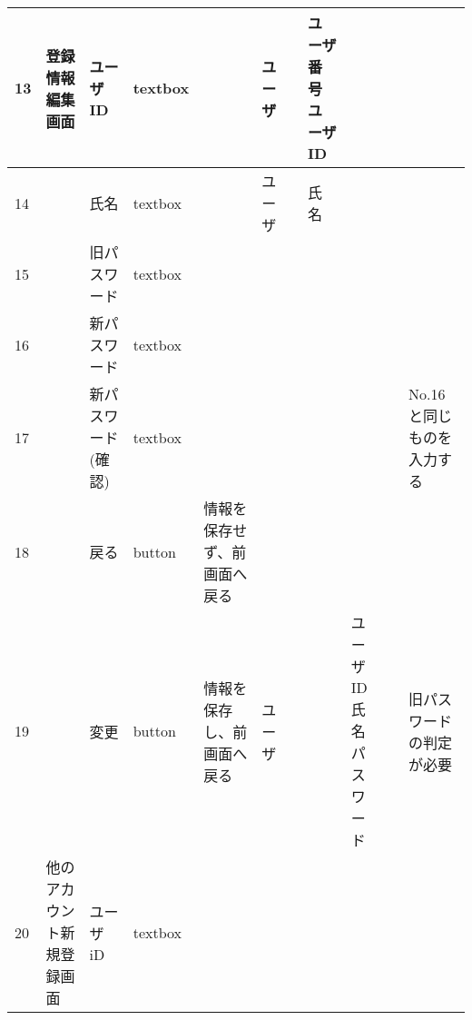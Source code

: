 \begin{table}[]
\begin{tabular}{|l|l|l|l|l|l|l|l|l|l|l|}
13  & 登録情報編集画面      & ユーザID            & textbox  &                                                                   & ユーザ     &                       & ユーザ番号ユーザID         &                 &                               &                                                                \\ \hline
14  &               & 氏名               & textbox  &                                                                   & ユーザ     &                       & 氏名                 &                 &                               &                                                                \\ \hline
15  &               & 旧パスワード           & textbox  &                                                                   &         &                       &                    &                 &                               &                                                                \\ \hline
16  &               & 新パスワード           & textbox  &                                                                   &         &                       &                    &                 &                               &                                                                \\ \hline
17  &               & 新パスワード(確認)       & textbox  &                                                                   &         &                       &                    &                 &                               & No.16と同じものを入力する                                                \\ \hline
18  &               & 戻る               & button   & 情報を保存せず、前画面へ戻る                                                    &         &                       &                    &                 &                               &                                                                \\ \hline
19  &               & 変更               & button   & 情報を保存し、前画面へ戻る                                                     & ユーザ     &                       &                    & ユーザID氏名パスワード    &                               & 旧パスワードの判定が必要                                                   \\ \hline
20  & 他のアカウント新規登録画面 & ユーザiD            & textbox  &                                                                   &         &                       &                    &                 &                               &                                                                \\ \hline

\end{tabular}
\end{table}

